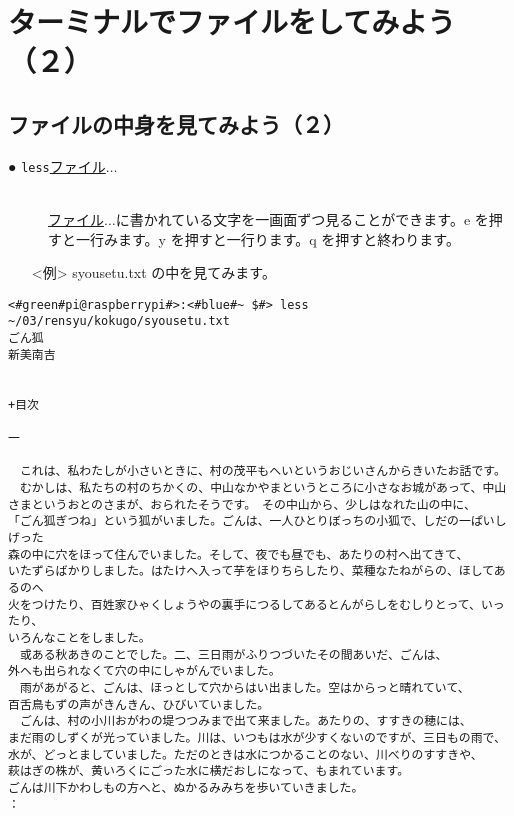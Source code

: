 \newpage
\section{ターミナルでファイルをしてみよう（２）}

\subsection{ファイルの中身を見てみよう（２）}
\begin{description}
\item[● \texttt{less}\textvisiblespace \underline{ファイル}$\ldots$]\mbox{}\\
\underline{ファイル}$\ldots$に書かれている文字を一画面ずつ見ることができます。e を押すと一行みます。y を押すと一行ります。q を押すと終わります。

\end{description}
\begin{itemize}
\item[<例>]syousetu.txt の中を見てみます。
\end{itemize}
\begin{lstlisting}[caption=lessの例, label=less]
<#green#pi@raspberrypi#>:<#blue#~ $#> less ~/03/rensyu/kokugo/syousetu.txt
ごん狐
新美南吉


+目次

一

　これは、私わたしが小さいときに、村の茂平もへいというおじいさんからきいたお話です。
　むかしは、私たちの村のちかくの、中山なかやまというところに小さなお城があって、中山
さまというおとのさまが、おられたそうです。　その中山から、少しはなれた山の中に、
「ごん狐ぎつね」という狐がいました。ごんは、一人ひとりぼっちの小狐で、しだの一ぱいしげった
森の中に穴をほって住んでいました。そして、夜でも昼でも、あたりの村へ出てきて、
いたずらばかりしました。はたけへ入って芋をほりちらしたり、菜種なたねがらの、ほしてあるのへ
火をつけたり、百姓家ひゃくしょうやの裏手につるしてあるとんがらしをむしりとって、いったり、
いろんなことをしました。
　或ある秋あきのことでした。二、三日雨がふりつづいたその間あいだ、ごんは、
外へも出られなくて穴の中にしゃがんでいました。
　雨があがると、ごんは、ほっとして穴からはい出ました。空はからっと晴れていて、
百舌鳥もずの声がきんきん、ひびいていました。
　ごんは、村の小川おがわの堤つつみまで出て来ました。あたりの、すすきの穂には、
まだ雨のしずくが光っていました。川は、いつもは水が少すくないのですが、三日もの雨で、
水が、どっとましていました。ただのときは水につかることのない、川べりのすすきや、
萩はぎの株が、黄いろくにごった水に横だおしになって、もまれています。
ごんは川下かわしもの方へと、ぬかるみみちを歩いていきました。
：
\end{lstlisting}

